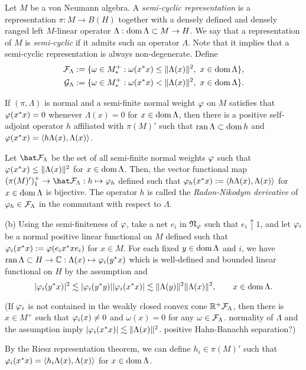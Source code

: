 \documentclass{../../large}
\begin{document}
\begin{prb}
Let $M$ be a von Neumann algebra.
A \emph{semi-cyclic representation} is a representation $\pi:M\to B(H)$ together with a densely defined and densely ranged left $M$-linear operator $\Lambda:\operatorname{dom}\Lambda\subset M\to H$.
We say that a representation of $M$ is \emph{semi-cyclic} if it admits such an operator $\Lambda$.
Note that it implies that a semi-cyclic representation is always non-degenerate.
Define
\begin{align*}
\cF_\Lambda:=\{\omega\in M_*^+:\omega(x^*x)\le\|\Lambda(x)\|^2,\ x\in\dom\Lambda\},\\
\cG_\Lambda:=\{\omega\in M_*^+:\omega(x^*x)<\|\Lambda(x)\|^2,\ x\in\dom\Lambda\}.
\end{align*}
\begin{parts}
\item 
\item If $(\pi,\Lambda)$ is normal and a semi-finite normal weight $\varphi$ on $M$ satisfies that $\varphi(x^*x)=0$ whenever $\Lambda(x)=0$ for $x\in\operatorname{dom}\Lambda$, then there is a positive self-adjoint operator $h$ affiliated with $\pi(M)'$ such that $\operatorname{ran}\Lambda\subset\operatorname{dom} h$ and $\varphi(x^*x)=\langle h\Lambda(x),\Lambda(x)\rangle$.
\item Let $\hat\cF_\Lambda$ be the set of all semi-finite normal weights $\varphi$ such that $\varphi(x^*x)\le\|\Lambda(x)\|^2$ for $x\in\operatorname{dom}\Lambda$. Then, the vector functional map $(\pi(M)')^+_1\to\hat\cF_\Lambda:h\mapsto\f_h$ defined such that $\varphi_h(x^*x):=\langle h\Lambda(x),\Lambda(x)\rangle$ for $x\in\operatorname{dom}\Lambda$ is bijective.
The operator $h$ is called the \emph{Radon-Nikodym derivative} of $\varphi_h\in\mathcal{F}_\Lambda$ in the commutant with respect to $\Lambda$.
\end{parts}
\end{prb}
\begin{pf}
(b)
Using the semi-finiteness of $\varphi$, take a net $e_i$ in $\mathfrak{N}_\varphi$ such that $e_i\uparrow1$, and let $\varphi_i$ be a normal positive linear functional on $M$ defined such that $\varphi_i(x^*x):=\varphi(e_ix^*xe_i)$ for $x\in M$.
For each fixed $y\in\operatorname{dom}\Lambda$ and $i$, we have $\operatorname{ran}\Lambda\subset H\to\mathbb{C}:\Lambda(x)\mapsto\varphi_i(y^*x)$ which is well-defined and bounded linear functional on $H$ by the assumption and
\[|\varphi_i(y^*x)|^2\lesssim|\varphi_i(y^*y)||\varphi_i(x^*x)|\lesssim\|\Lambda(y)\|^2\|\Lambda(x)\|^2,\qquad x\in\operatorname{dom}\Lambda.\]


(If $\varphi_i$ is not contained in the weakly closed convex cone $\mathbb{R}^+\mathcal{F}_\Lambda$, then there is $x\in M^+$ such that $\varphi_i(x)\ne0$ and $\omega(x)=0$ for any $\omega\in\mathcal{F}_\Lambda$.
normality of $\Lambda$ and the assumption imply $|\varphi_i(x^*x)|\lesssim\|\Lambda(x)\|^2$.
positive Hahn-Banachh separation?)


By the Riesz representation theorem, we can define $h_i\in\pi(M)'$ such that $\varphi_i(x^*x)=\langle h_i\Lambda(x),\Lambda(x)\rangle$ for $x\in\operatorname{dom}\Lambda$.
\end{pf}
\end{document}
